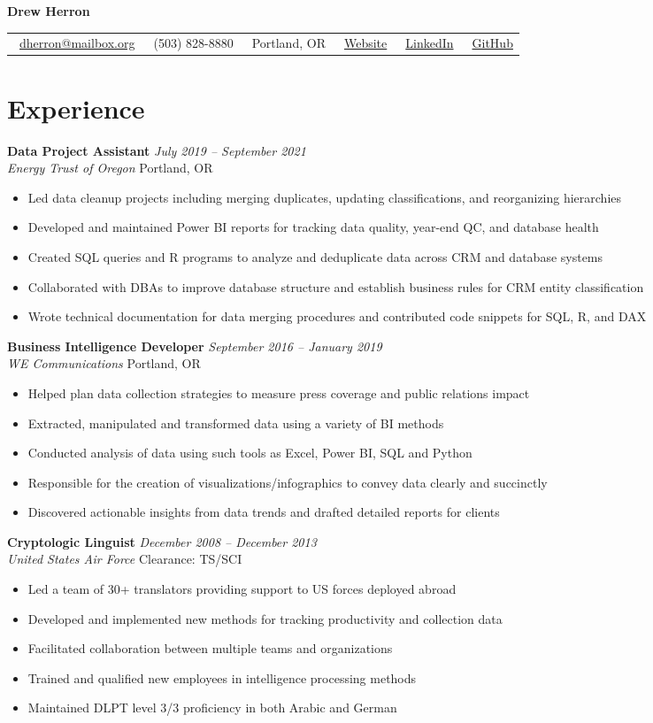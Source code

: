 \documentclass[letterpaper,11pt]{article}
\makeatletter
\newcommand{\contact}[6]{
  \begin{center}
    \begin{tabular*}{\textwidth}{@{\extracolsep{\fill}} l l l l l l}
      \faEnvelope\ \href{mailto:#1}{#1} & 
      \faPhone\ #2 & 
      \faMapMarker*\ #3 & 
      \faGlobe\ \href{#4}{Website} & 
      \faLinkedin\ \href{#5}{LinkedIn} &
      \faGithub\ \href{#6}{GitHub}
    \end{tabular*}
  \end{center}
}
\newcommand{\entry}[4]{
  \vspace{0.1em}
  \noindent\textbf{#1} \hfill \textit{#2}
  \\ \textit{#3} \hfill #4
  \vspace{0.3em}
}
\newcommand{\achievement}[1]{
  \vspace{-.5em}
  \item #1
}
\makeatother
\begin{document}
\begin{center}
  {\Huge\textbf{Drew Herron}}
\end{center}
  \vspace{.1cm}
  \contact
    {dherron@mailbox.org}
    {(503) 828-8880}
    {Portland, OR}
    {https://www.drewherron.com}
    {https://www.linkedin.com/in/drew-herron}
    {https://github.com/drewherron}

\section{Experience}

\entry{Data Project Assistant}{July 2019 -- September 2021}{Energy Trust of Oregon}{Portland, OR}
\begin{itemize}[leftmargin=*]
  \achievement{Led data cleanup projects including merging duplicates, updating classifications, and reorganizing hierarchies}
  \achievement{Developed and maintained Power BI reports for tracking data quality, year-end QC, and database health}
  \achievement{Created SQL queries and R programs to analyze and deduplicate data across CRM and database systems}
  \achievement{Collaborated with DBAs to improve database structure and establish business rules for CRM entity classification}
  \achievement{Wrote technical documentation for data merging procedures and contributed code snippets for SQL, R, and DAX}
\end{itemize}

\entry{Business Intelligence Developer}{September 2016 -- January 2019}{WE Communications}{Portland, OR}
\begin{itemize}[leftmargin=*]
  \achievement{Helped plan data collection strategies to measure press coverage and public relations impact}
  \achievement{Extracted, manipulated and transformed data using a variety of BI methods}
  \achievement{Conducted analysis of data using such tools as Excel, Power BI, SQL and Python}
  \achievement{Responsible for the creation of visualizations/infographics to convey data clearly and succinctly}
  \achievement{Discovered actionable insights from data trends and drafted detailed reports for clients}
\end{itemize}

\entry{Cryptologic Linguist}{December 2008 -- December 2013}{United States Air Force}{Clearance: TS\hspace{.1em}/\hspace{.03em}SCI}
\begin{itemize}[leftmargin=*]
  \achievement{Led a team of 30+ translators providing support to US forces deployed abroad}
  \achievement{Developed and implemented new methods for tracking productivity and collection data}
  \achievement{Facilitated collaboration between multiple teams and organizations}
  \achievement{Trained and qualified new employees in intelligence processing methods}
  \achievement{Maintained DLPT level 3/3 proficiency in both Arabic and German}
\end{itemize}
\end{document}
